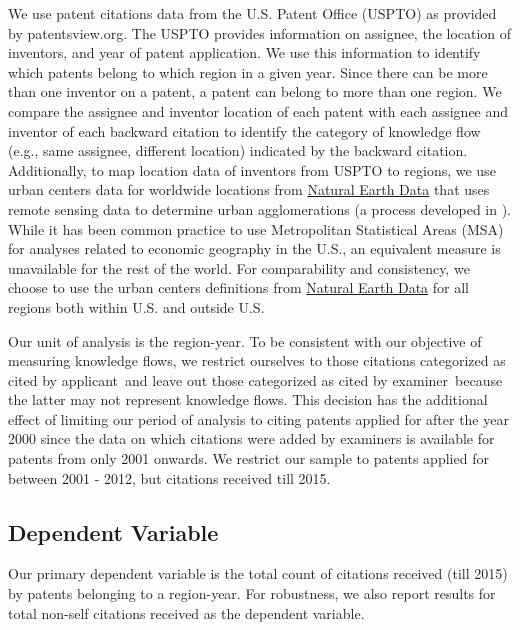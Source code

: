 \documentclass[12pt,letterpaper]{article}
\begin{document}
We use patent citations data from the U.S. Patent Office (USPTO) as provided by patentsview.org. The USPTO provides information on assignee, the location of inventors, and year of patent application. We use this information to identify which patents belong to which region in a given year. Since there can be more than one inventor on a patent, a patent can belong to more than one region. We compare the assignee and inventor location of each patent with each assignee and inventor of each backward citation  to identify the category of knowledge flow (e.g., same assignee, different location) indicated by the backward citation. Additionally, to map location data of inventors from USPTO to regions, we use urban centers data for worldwide locations from \href{http://www.naturalearthdata.com/downloads/10m-cultural-vectors/}{Natural Earth Data} that uses remote sensing data to determine urban agglomerations (a process developed in \citet*{Schneider2003}).  While it has been common practice to use Metropolitan Statistical Areas (MSA) for analyses related to economic geography in the U.S., an equivalent measure is unavailable for the rest of the world. For comparability and consistency, we choose to use the urban centers definitions from \href{http://www.naturalearthdata.com/downloads/10m-cultural-vectors/}{Natural Earth Data} for all regions both within U.S. and outside U.S. \par
Our unit of analysis is the region-year. To be consistent with our objective of measuring knowledge flows, we restrict ourselves to those citations categorized as \textquotesingle cited by applicant\textquotesingle \ and leave out those categorized as \textquotesingle cited by examiner\textquotesingle \ because the latter may not represent knowledge flows. This decision has the additional effect of limiting our period of analysis to citing patents applied for after the year 2000 since the data on which citations were added by examiners is available for patents from only 2001 onwards. We restrict our sample to patents applied for between 2001 - 2012, but citations received till 2015. \par
\subsection{Dependent Variable}
Our primary dependent variable is the  total count of citations received (till 2015) by patents belonging to a region-year. For robustness, we also report results for total non-self citations received as the dependent variable. 
\end{document}
